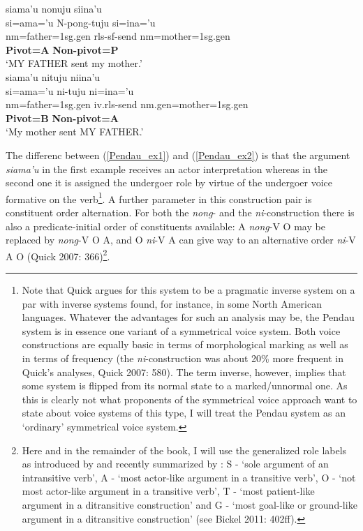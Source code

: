 \pex 
\a \label{Pendau_ex1}
\gllll siama'u nonuju siina'u \\
si=ama='u N-pong-tuju si=ina='u \\
 \acs{nm}=father=\acs{1}\acs{sg}.\acs{gen} \acs{rls}-\acs{sf}-send \acs{nm}=mother=\acs{1}\acs{sg}.\acs{gen} \\
 \textbf{Pivot=A} {} \textbf{Non-pivot=P} \\
\glft `MY FATHER sent my mother.' \\ 
\endgl
\a \label{Pendau_ex2}
\gllll siama'u nituju niina'u \\
si=ama='u ni-tuju ni=ina='u \\
 \acs{nm}=father=\acs{1}\acs{sg}.\acs{gen} \acs{iv}.\acs{rls}-send \acs{nm}.\acs{gen}=mother=\acs{1}\acs{sg}.\acs{gen} \\
 \textbf{Pivot=B} {} \textbf{Non-pivot=A} \\
\glft `My mother sent MY FATHER.' \\ 
\endgl
\xe

The differenc between (\ref{Pendau_ex1}) and (\ref{Pendau_ex2}) is that the argument \textit{siama'u} in the first example receives an actor interpretation whereas in the second one it is assigned the undergoer role by virtue of the undergoer voice formative on the verb\footnote{Note that Quick argues for this system to be a pragmatic inverse system on a par with inverse systems found, for instance, in some North American languages. Whatever the advantages for such an analysis may be, the Pendau system is in essence one variant of a symmetrical voice system. Both voice constructions are equally basic in terms of morphological marking as well as in terms of frequency (the \textit{ni}-construction was about 20\% more frequent in Quick's analyses, Quick 2007: 580). The term inverse, however, implies that some system is flipped from its normal state to a marked/unnormal one. As this is clearly not what proponents of the symmetrical voice approach want to state about voice systems of this type, I will treat the Pendau system as an `ordinary' symmetrical voice system.}. A further parameter in this construction pair is constituent order alternation. For both the \textit{nong}- and the \textit{ni}-construction there is also a predicate-initial order of constituents available: A \textit{nong}-V O may be replaced by \textit{nong}-V O A, and O \textit{ni}-V A can give way to an alternative order \textit{ni}-V A O (Quick 2007: 366)\footnote{Here and in the remainder of the book, I will use the generalized role labels as introduced by \textcite{Dixon1979} and recently summarized by \textcite{Bickel2011}: S - `sole argument of an intransitive verb', A - `most actor-like argument in a transitive verb', O - `not most actor-like argument in a transitive verb', T - `most patient-like argument in a ditransitive construction' and G - `most goal-like or ground-like argument in a ditransitive construction' (see Bickel 2011: 402ff).}.

